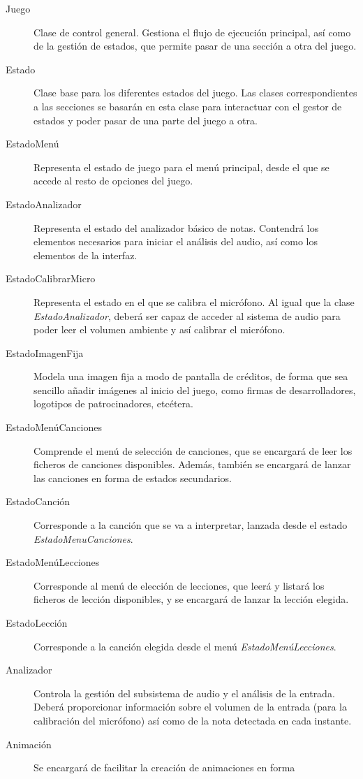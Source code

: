 \begin{description}
\item[Juego] Clase de control general. Gestiona el flujo de ejecución principal,
  así como de la gestión de estados, que permite pasar de una sección a otra del
  juego.
\item[Estado] Clase base para los diferentes estados del juego. Las clases
  correspondientes a las secciones se basarán en esta clase para interactuar con
  el gestor de estados y poder pasar de una parte del juego a otra.
\item[EstadoMenú] Representa el estado de juego para el menú principal, desde el
  que se accede al resto de opciones del juego. 
\item[EstadoAnalizador] Representa el estado del analizador básico de
  notas. Contendrá los elementos necesarios para iniciar el análisis del audio,
  así como los elementos de la interfaz.
\item[EstadoCalibrarMicro] Representa el estado en el que se calibra el
  micrófono. Al igual que la clase \textit{EstadoAnalizador}, deberá ser capaz
  de acceder al sistema de audio para poder leer el volumen ambiente y así
  calibrar el micrófono.
\item[EstadoImagenFija] Modela una imagen fija a modo de pantalla de créditos,
  de forma que sea sencillo añadir imágenes al inicio del juego, como firmas de
  desarrolladores, logotipos de patrocinadores, etcétera.
\item[EstadoMenúCanciones] Comprende el menú de selección de canciones, que se
  encargará de leer los ficheros de canciones disponibles. Además, también se
  encargará de lanzar las canciones en forma de estados secundarios.
\item[EstadoCanción] Corresponde a la canción que se va a interpretar, lanzada desde
  el estado \textit{EstadoMenuCanciones}.
\item[EstadoMenúLecciones] Corresponde al menú de elección de lecciones, que
  leerá y listará los ficheros de lección disponibles, y se encargará de lanzar
  la lección elegida.
\item[EstadoLección] Corresponde a la canción elegida desde el menú
  \textit{EstadoMenúLecciones}.
\item[Analizador] Controla la gestión del subsistema de audio y el análisis de
  la entrada. Deberá proporcionar información sobre el volumen de la entrada
  (para la calibración del micrófono) así como de la nota detectada en cada
  instante.
\item[Animación] Se encargará de facilitar la creación de animaciones en forma

\end{description}

